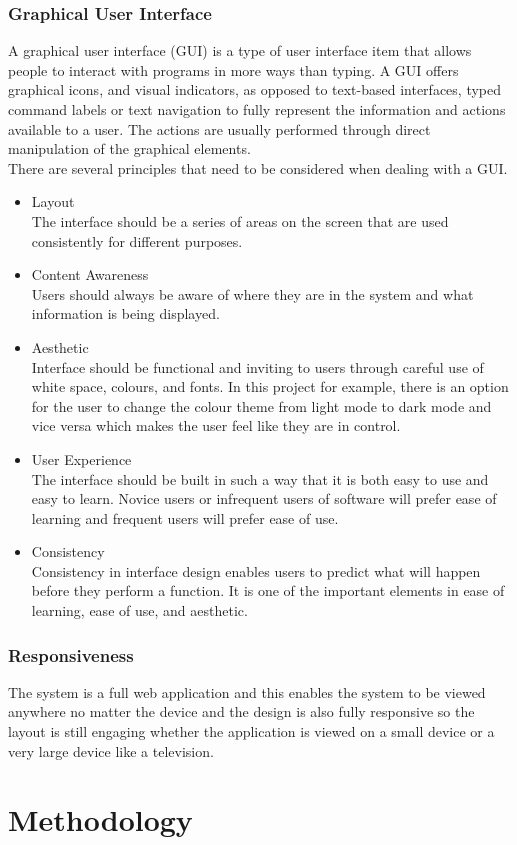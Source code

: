 \documentclass[twoside, a4paper, 12pt]{report}
\begin{document}
\subsection{Graphical User Interface}
A graphical user interface (GUI) is a type of user interface item that allows people to interact with programs in more ways than typing. A GUI offers graphical icons, and visual indicators, as opposed to text-based interfaces, typed command labels or text navigation to fully represent the information and actions available to a user. The actions are usually performed through direct manipulation of the graphical elements.\\
\indent
There are several principles that need to be considered when dealing with a GUI.
\begin{itemize}
\item Layout\\
The interface should be a series of areas on the screen that are used consistently for different purposes.
\item Content Awareness\\
Users should always be aware of where they are in the system and what information is being displayed.
\item Aesthetic\\
Interface should be functional and inviting to users through careful use of white space, colours, and fonts. In this project for example, there is an option for the user to change the colour theme from light mode to dark mode and vice versa which makes the user feel like they are in control.
\item User Experience\\
The interface should be built in such a way that it is both easy to use and easy to learn. Novice users or infrequent users of software will prefer ease of learning and frequent users will prefer ease of use.
\item Consistency\\
Consistency in interface design enables users to predict what will happen before they perform a function. It is one of the important elements in ease of learning, ease of use, and aesthetic.
\end{itemize}

\subsection{Responsiveness}
The system is a full web application and this enables the system to be viewed anywhere no matter the device and the design is also fully responsive so the layout is still engaging whether the application is viewed on a small device or a very large device like a television. 

\chapter{Methodology}

% 
% 
\printbibliography
\end{document}
